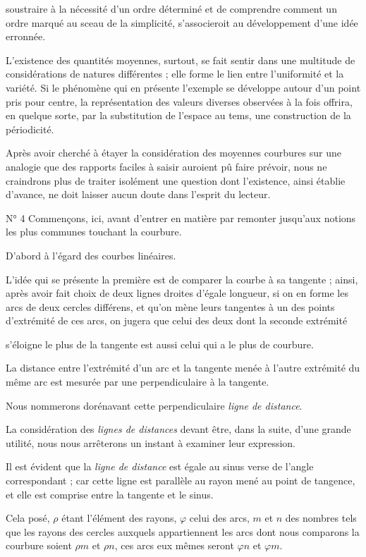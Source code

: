 \documentclass[11pt,a4paper]{article}
\begin{document}
soustraire à la nécessité d'un ordre déterminé et de comprendre comment un
ordre marqué au sceau de la simplicité, s'associeroit au développement d'une
idée erronnée.

L'existence des quantités moyennes, surtout, se fait sentir dans une
multitude de considérations de natures différentes ; elle forme le lien
entre l'uniformité et la variété. Si le phénomène qui en présente l'exemple
se développe autour d'un point pris pour centre, la représentation des
valeurs diverses observées à la fois offrira, en quelque sorte, par la
substitution de l'espace au tems, une construction de la périodicité.

Après avoir cherché à étayer la considération des moyennes courbures sur une
analogie que des rapports faciles à saisir auroient pû faire prévoir, nous
ne craindrons plus de traiter isolément une question dont l'existence, ainsi
établie d'avance, ne doit laisser aucun doute dans l'esprit du lecteur.

N° 4 Commençons, ici, avant d'entrer en matière par remonter jusqu'aux notions
les plus communes touchant la courbure.

D'abord à l'égard des courbes linéaires.

L'idée qui se présente la première est de comparer la courbe à sa tangente ;
ainsi, après avoir fait choix de deux lignes droites d'égale longueur, si on
en forme les arcs de deux cercles différens, et qu'on mène leurs tangentes à
un des points d'extrémité de ces arcs, on jugera que celui des deux dont la
seconde extrémité

s'éloigne le plus de la tangente est aussi celui qui a le plus de courbure.

La distance entre l'extrémité d'un arc et la tangente menée à l'autre
extrémité du même arc est mesurée par une perpendiculaire à la tangente.

Nous nommerons dorénavant cette perpendiculaire \emph{ligne de distance}.

La considération des \emph{lignes de distances} devant être, dans la suite,
d'une grande utilité, nous nous arrêterons un instant à examiner leur
expression.

Il est évident que la \emph{ligne de distance} est égale au sinus verse de
l'angle correspondant ; car cette ligne est parallèle au rayon mené au point
de tangence, et elle est comprise entre la tangente et le sinus.

Cela posé, $\rho$ étant l'élément des rayons, $\varphi$ celui des arcs, $m$
et $n$ des nombres tels que les rayons des cercles auxquels appartiennent
les arcs dont nous comparons la courbure soient $\rho m$ et $\rho n$, ces
arcs eux mêmes seront $\varphi n$ et $\varphi m$.
\end{document}

